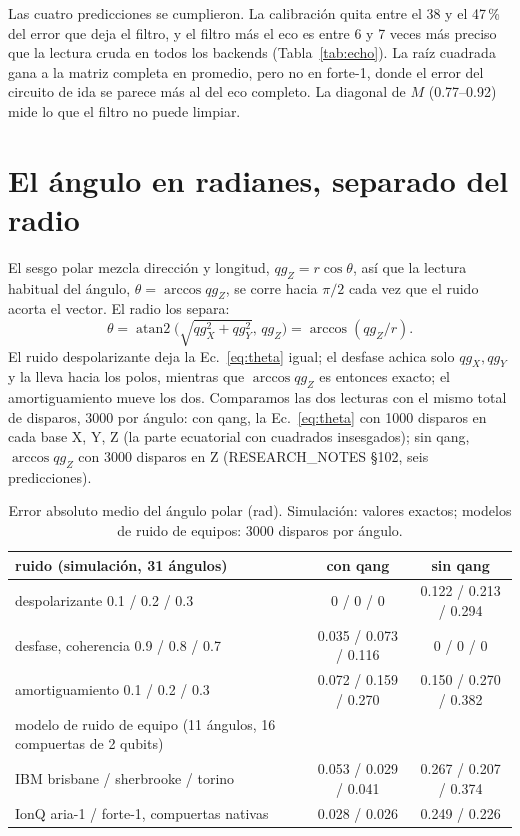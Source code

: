 \documentclass[11pt]{article}
\newcommand{\qZ}{qg_Z}
\newcommand{\qX}{qg_X}
\newcommand{\qY}{qg_Y}
\begin{document}
Las cuatro predicciones se cumplieron. La calibración quita entre el 38 y el 47\,\% del error que deja el filtro, y el
filtro más el eco es entre 6 y 7 veces más preciso que la lectura cruda en todos los backends (Tabla~\ref{tab:echo}).
La raíz cuadrada gana a la matriz completa en promedio, pero no en forte-1, donde el error del circuito de ida se parece
más al del eco completo. La diagonal de $M$ (0.77--0.92) mide lo que el filtro no puede limpiar.

\section{El ángulo en radianes, separado del radio}\label{sec:angle}

El sesgo polar mezcla dirección y longitud, $\qZ=r\cos\theta$, así que la lectura habitual del ángulo,
$\theta=\arccos\qZ$, se corre hacia $\pi/2$ cada vez que el ruido acorta el vector. El radio los separa:
\begin{equation}\label{eq:theta}
\theta=\operatorname{atan2}\!\big(\sqrt{\qX^2+\qY^2},\,\qZ\big)=\arccos(\qZ/r).
\end{equation}
El ruido despolarizante deja la Ec.~\eqref{eq:theta} igual; el desfase achica solo $\qX,\qY$ y la lleva hacia los
polos, mientras que $\arccos\qZ$ es entonces exacto; el amortiguamiento mueve los dos. Comparamos las dos lecturas con
el mismo total de disparos, 3000 por ángulo: con qang, la Ec.~\eqref{eq:theta} con 1000 disparos en cada base X, Y, Z
(la parte ecuatorial con cuadrados insesgados); sin qang, $\arccos\qZ$ con 3000 disparos en Z (RESEARCH\_NOTES \S102,
seis predicciones).

\begin{table}[h]
\centering\small
\begin{tabular}{lcc}
\toprule
ruido (simulación, 31 ángulos) & con qang & sin qang \\
\midrule
despolarizante 0.1 / 0.2 / 0.3 & 0 / 0 / 0 & 0.122 / 0.213 / 0.294 \\
desfase, coherencia 0.9 / 0.8 / 0.7 & 0.035 / 0.073 / 0.116 & 0 / 0 / 0 \\
amortiguamiento 0.1 / 0.2 / 0.3 & 0.072 / 0.159 / 0.270 & 0.150 / 0.270 / 0.382 \\
\midrule
modelo de ruido de equipo (11 ángulos, 16 compuertas de 2 qubits) & & \\
IBM brisbane / sherbrooke / torino & 0.053 / 0.029 / 0.041 & 0.267 / 0.207 / 0.374 \\
IonQ aria-1 / forte-1, compuertas nativas & 0.028 / 0.026 & 0.249 / 0.226 \\
\bottomrule
\end{tabular}
\caption{Error absoluto medio del ángulo polar (rad). Simulación: valores exactos; modelos de ruido de equipos: 3000
disparos por ángulo.}
\label{tab:theta}
\end{table}
\end{document}
